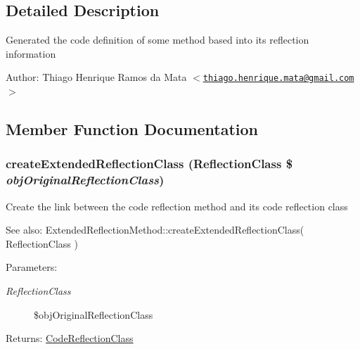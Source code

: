 \subsection{Detailed Description}
Generated the code definition of some method based into its reflection information

\begin{Desc}
\item[Author:]Thiago Henrique Ramos da Mata $<$\href{mailto:thiago.henrique.mata@gmail.com}{\tt thiago.henrique.mata@gmail.com}$>$ \end{Desc}


\subsection{Member Function Documentation}
\hypertarget{class_code_reflection_method_6b56ec198bc6a5b5a72076e4e7c19e29}{
\subsubsection[{createExtendedReflectionClass}]{\setlength{\rightskip}{0pt plus 5cm}createExtendedReflectionClass (ReflectionClass \$ {\em objOriginalReflectionClass})}}
\label{class_code_reflection_method_6b56ec198bc6a5b5a72076e4e7c19e29}


Create the link between the code reflection method and its code reflection class

\begin{Desc}
\item[See also:]ExtendedReflectionMethod::createExtendedReflectionClass( ReflectionClass ) \end{Desc}
\begin{Desc}
\item[Parameters:]
\begin{description}
\item[{\em ReflectionClass}]\$objOriginalReflectionClass \end{description}
\end{Desc}
\begin{Desc}
\item[Returns:]\hyperlink{class_code_reflection_class}{CodeReflectionClass} \end{Desc}


